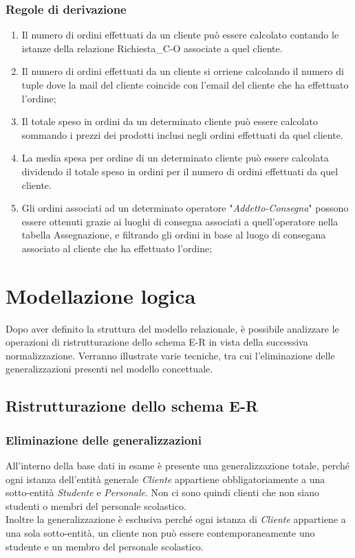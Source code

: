\documentclass[12pt,a4paper]{article}
\begin{document}
    \subsubsection{Regole di derivazione}
    \begin{enumerate}[leftmargin=3em,label=\textbf{(RD\arabic*)}]
        \item  Il numero di ordini effettuati da un cliente può essere calcolato contando le istanze della relazione Richiesta\_C-O associate a quel cliente.
        \item Il numero di ordini effettuati da un cliente si orriene calcolando il numero di tuple dove la mail del cliente coincide con l'email del cliente che ha effettuato l'ordine;
        \item Il totale speso in ordini da un determinato cliente può essere calcolato sommando i prezzi dei prodotti inclusi negli ordini effettuati da quel cliente.
        \item La media spesa per ordine di un determinato cliente può essere calcolata dividendo il totale speso in ordini per il numero di ordini effettuati da quel cliente.
        \item Gli ordini associati ad un determinato operatore "\textit{Addetto-Consegna}" possono essere ottenuti grazie ai luoghi di consegna associati a quell'operatore nella tabella Assegnazione, e filtrando gli ordini in base al luogo di consegana associato al cliente che ha effettuato l'ordine; 
    \end{enumerate}

    \newpage
    \section{Modellazione logica}
    Dopo aver definito la struttura del modello relazionale, è possibile analizzare le operazioni  di ristrutturazione dello schema E-R in vista della successiva normalizzazione. Verranno illustrate varie tecniche, tra cui l'eliminazione delle generalizzazioni presenti nel modello concettuale.

    \subsection{Ristrutturazione dello schema E-R}
    \subsubsection{Eliminazione delle generalizzazioni}
    All'interno della base dati in esame è presente una generalizzazione totale, perché ogni istanza dell'entità generale \textit{Cliente} appartiene obbligatoriamente a una sotto-entità \textit{Studente} e \textit{Personale}. Non ci sono quindi clienti che non siano studenti o membri del personale scolastico.\\
    Inoltre la generalizzazione è esclusiva perché ogni istanza di \textit{Cliente} appartiene a una sola sotto-entità, un cliente non può essere contemporaneamente uno studente e un membro del personale scolastico.
\end{document}
